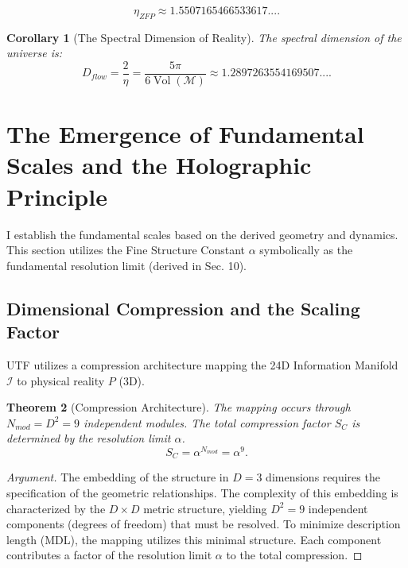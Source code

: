 \documentclass[11pt, a4paper]{article}
\newtheorem{theorem}{Theorem}[section]
\newtheorem{corollary}[theorem]{Corollary}
\theoremstyle{definition}
\theoremstyle{definition}
\newcommand{\M}{\mathcal{M}}
\newcommand{\Ical}{\mathcal{I}}
\newcommand{\Vol}{\operatorname{Vol}}
\newcommand{\Veight}{\Vol(\M)}
\newcommand{\Dflowval}{1.2897263554169507...}
\newcommand{\etaval}{1.5507165466533617...}
\begin{document}
\begin{equation}
    \eta_{ZFP} \approx \etaval.
\end{equation}

\begin{corollary}[The Spectral Dimension of Reality]
The spectral dimension of the universe is:
\begin{equation}
    D_{flow} = \frac{2}{\eta} = \frac{5\pi}{6\Veight} \approx \Dflowval.
\end{equation}
\end{corollary}

\section{The Emergence of Fundamental Scales and the Holographic Principle}

I establish the fundamental scales based on the derived geometry and dynamics. This section utilizes the Fine Structure Constant $\alpha$ symbolically as the fundamental resolution limit (derived in Sec. 10).

\subsection{Dimensional Compression and the Scaling Factor}

UTF utilizes a compression architecture mapping the 24D Information Manifold $\Ical$ to physical reality $P$ (3D).

\begin{theorem}[Compression Architecture]\label{thm:CompressionArch}
The mapping occurs through $N_{mod}=D^2=9$ independent modules. The total compression factor $S_C$ is determined by the resolution limit $\alpha$.
\begin{equation}
    S_C = \alpha^{N_{mod}} = \alpha^9.
\end{equation}
\end{theorem}
\begin{proof}[Argument]
The embedding of the structure in $D=3$ dimensions requires the specification of the geometric relationships. The complexity of this embedding is characterized by the $D \times D$ metric structure, yielding $D^2=9$ independent components (degrees of freedom) that must be resolved. To minimize description length (MDL), the mapping utilizes this minimal structure. Each component contributes a factor of the resolution limit $\alpha$ to the total compression.
\end{proof}
\end{document}
